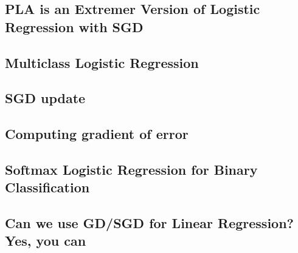 \subsection{PLA is an Extremer Version of Logistic Regression with SGD}

\subsection{Multiclass Logistic Regression}

\subsection{SGD update}

\subsection{Computing gradient of error}

\subsection{Softmax Logistic Regression for Binary Classification}

\subsection{Can we use GD/SGD for Linear Regression? Yes, you can}
